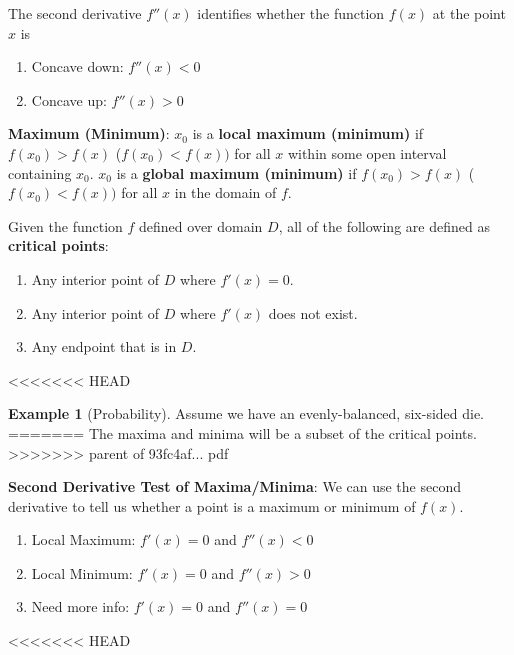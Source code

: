 \documentclass[]{book}
\providecommand{\tightlist}{%
  \setlength{\itemsep}{0pt}\setlength{\parskip}{0pt}}
\theoremstyle{definition}
\theoremstyle{definition}
\newtheorem{example}{Example}[chapter]
\theoremstyle{definition}
\theoremstyle{remark}
\begin{document}
The second derivative \(f''(x)\) identifies whether the function \(f(x)\) at the point \(x\) is

\begin{enumerate}
\def\labelenumi{\arabic{enumi}.}
\tightlist
\item
  Concave down: \(f''(x)<0\)
\item
  Concave up: \(f''(x)>0\)
\end{enumerate}

\textbf{Maximum (Minimum)}: \(x_0\) is a \textbf{local maximum (minimum)} if \(f(x_0)>f(x)\) (\(f(x_0)<f(x))\) for all \(x\) within some open interval containing \(x_0\). \(x_0\) is a \textbf{global maximum (minimum)} if \(f(x_0)>f(x)\) (\(f(x_0)<f(x))\) for all \(x\) in the domain of \(f\).

Given the function \(f\) defined over domain \(D\), all of the following are defined as \textbf{critical points}:

\begin{enumerate}
\def\labelenumi{\arabic{enumi}.}
\tightlist
\item
  Any interior point of \(D\) where \(f'(x)=0\).
\item
  Any interior point of \(D\) where \(f'(x)\) does not exist.
\item
  Any endpoint that is in \(D\).
\end{enumerate}

<<<<<<< HEAD
\begin{example}[Probability]
\protect\hypertarget{exm:prob}{}{\label{exm:prob} {} }
Assume we have an evenly-balanced, six-sided die.
=======
The maxima and minima will be a subset of the critical points.
>>>>>>> parent of 93fc4af... pdf

\textbf{Second Derivative Test of Maxima/Minima}: We can use the second derivative to tell us whether a point is a maximum or minimum of \(f(x)\).

\begin{enumerate}
\def\labelenumi{\arabic{enumi}.}
\tightlist
\item
  Local Maximum: \(f'(x)=0\) and \(f''(x)<0\)
\item
  Local Minimum: \(f'(x)=0\) and \(f''(x)>0\)
\item
  Need more info: \(f'(x)=0\) and \(f''(x)=0\)
\end{enumerate}
<<<<<<< HEAD
\end{example}
\end{document}
